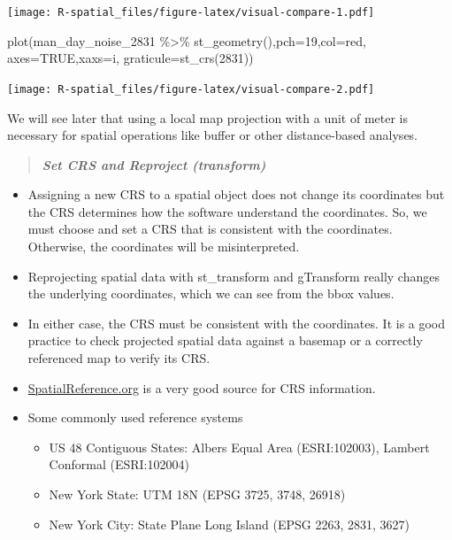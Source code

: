 \documentclass[
  11pt,
]{book}
\newenvironment{Shaded}{\begin{snugshade}}{\end{snugshade}}
\newcommand{\AttributeTok}[1]{\textcolor[rgb]{0.77,0.63,0.00}{#1}}
\newcommand{\ConstantTok}[1]{\textcolor[rgb]{0.00,0.00,0.00}{#1}}
\newcommand{\DecValTok}[1]{\textcolor[rgb]{0.00,0.00,0.81}{#1}}
\newcommand{\FunctionTok}[1]{\textcolor[rgb]{0.00,0.00,0.00}{#1}}
\newcommand{\NormalTok}[1]{#1}
\newcommand{\SpecialCharTok}[1]{\textcolor[rgb]{0.00,0.00,0.00}{#1}}
\newcommand{\StringTok}[1]{\textcolor[rgb]{0.31,0.60,0.02}{#1}}
\providecommand{\tightlist}{%
  \setlength{\itemsep}{0pt}\setlength{\parskip}{0pt}}
\begin{document}
\texttt{[image: R-spatial\_files/figure-latex/visual-compare-1.pdf]}

\begin{Shaded}
\begin{Highlighting}[]
\FunctionTok{plot}\NormalTok{(man\_day\_noise\_2831 }\SpecialCharTok{\%\textgreater{}\%} \FunctionTok{st\_geometry}\NormalTok{(),}\AttributeTok{pch=}\DecValTok{19}\NormalTok{,}\AttributeTok{col=}\StringTok{\textquotesingle{}red\textquotesingle{}}\NormalTok{, }\AttributeTok{axes=}\ConstantTok{TRUE}\NormalTok{,}\AttributeTok{xaxs=}\StringTok{\textquotesingle{}i\textquotesingle{}}\NormalTok{, }\AttributeTok{graticule=}\FunctionTok{st\_crs}\NormalTok{(}\DecValTok{2831}\NormalTok{))}
\end{Highlighting}
\end{Shaded}

\texttt{[image: R-spatial\_files/figure-latex/visual-compare-2.pdf]}

We will see later that using a local map projection with a unit of meter is necessary for spatial operations like buffer or other distance-based analyses.

\begin{quote}
\textbf{\emph{Set CRS and Reproject (transform)}}
\end{quote}

\begin{itemize}
\tightlist
\item
  Assigning a new CRS to a spatial object does not change its coordinates but the CRS determines how the software understand the coordinates. So, we must choose and set a CRS that is consistent with the coordinates. Otherwise, the coordinates will be misinterpreted.
\item
  Reprojecting spatial data with st\_transform and gTransform really changes the underlying coordinates, which we can see from the bbox values.\\
\item
  In either case, the CRS must be consistent with the coordinates. It is a good practice to check projected spatial data against a basemap or a correctly referenced map to verify its CRS.
\item
  \href{https://spatialreference.org/}{SpatialReference.org} is a very good source for CRS information.
\item
  Some commonly used reference systems

  \begin{itemize}
  \tightlist
  \item
    US 48 Contiguous States: Albers Equal Area (ESRI:102003), Lambert Conformal (ESRI:102004)
  \item
    New York State: UTM 18N (EPSG 3725, 3748, 26918)
  \item
    New York City: State Plane Long Island (EPSG 2263, 2831, 3627)
  \end{itemize}
\end{itemize}
\end{document}
